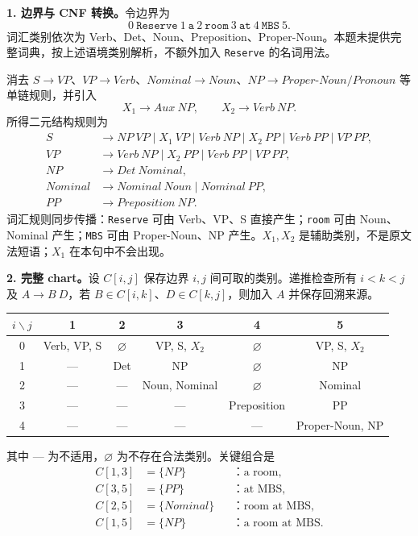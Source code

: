 \begin{checkedsolution}
\textbf{1. 边界与 CNF 转换。}令边界为
\[
0\ \texttt{Reserve}\ 1\ \texttt{a}\ 2\ \texttt{room}\ 3\
\texttt{at}\ 4\ \texttt{MBS}\ 5.
\]
词汇类别依次为 Verb、Det、Noun、Preposition、Proper-Noun。本题未提供完整词典，按上述语境类别解析，不额外加入 \texttt{Reserve} 的名词用法。

消去 $S\rightarrow VP$、$VP\rightarrow Verb$、$Nominal\rightarrow Noun$、$NP\rightarrow Proper\text{-}Noun/Pronoun$ 等单链规则，并引入
\[
X_1\rightarrow Aux\ NP,\qquad X_2\rightarrow Verb\ NP.
\]
所得二元结构规则为
\[
\begin{aligned}
S&\rightarrow NP\ VP\mid X_1\ VP\mid Verb\ NP
   \mid X_2\ PP\mid Verb\ PP\mid VP\ PP,\\
VP&\rightarrow Verb\ NP\mid X_2\ PP\mid Verb\ PP\mid VP\ PP,\\
NP&\rightarrow Det\ Nominal,\\
Nominal&\rightarrow Nominal\ Noun\mid Nominal\ PP,\\
PP&\rightarrow Preposition\ NP.
\end{aligned}
\]
词汇规则同步传播：\texttt{Reserve} 可由 Verb、VP、S 直接产生；\texttt{room} 可由 Noun、Nominal 产生；\texttt{MBS} 可由 Proper-Noun、NP 产生。$X_1,X_2$ 是辅助类别，不是原文法短语；$X_1$ 在本句中不会出现。

\textbf{2. 完整 chart。}设 $C[i,j]$ 保存边界 $i,j$ 间可取的类别。递推检查所有 $i<k<j$ 及 $A\rightarrow B\ D$，若 $B\in C[i,k]$、$D\in C[k,j]$，则加入 $A$ 并保存回溯来源。
\begin{center}
\small
\setlength{\tabcolsep}{5pt}
\begin{tabular}{@{}c c c c c c@{}}
\toprule
$i\backslash j$ & 1 & 2 & 3 & 4 & 5 \\
\midrule
0 & Verb, VP, S & $\varnothing$ & VP, S, $X_2$ & $\varnothing$ & VP, S, $X_2$ \\
1 & --- & Det & NP & $\varnothing$ & NP \\
2 & --- & --- & Noun, Nominal & $\varnothing$ & Nominal \\
3 & --- & --- & --- & Preposition & PP \\
4 & --- & --- & --- & --- & Proper-Noun, NP \\
\bottomrule
\end{tabular}
\end{center}
其中 --- 为不适用，$\varnothing$ 为不存在合法类别。关键组合是
\[
\begin{aligned}
C[1,3]&=\{NP\} &&\text{：a room},\\
C[3,5]&=\{PP\} &&\text{：at MBS},\\
C[2,5]&=\{Nominal\} &&\text{：room at MBS},\\
C[1,5]&=\{NP\} &&\text{：a room at MBS}.
\end{aligned}
\]


\end{checkedsolution}
